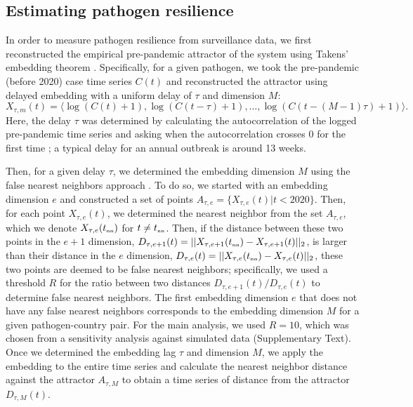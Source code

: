 \documentclass[12pt]{article}
\newcommand{\tsub}[2]{#1_{{\textrm{\tiny #2}}}}
\begin{document}
\subsection*{Estimating pathogen resilience}

In order to measure pathogen resilience from surveillance data, we first reconstructed the empirical pre-pandemic attractor of the system using Takens' embedding theorem \citep{takens2006detecting}.
Specifically, for a given pathogen, we took the pre-pandemic (before 2020) case time series $C(t)$ and reconstructed the attractor using delayed embedding with a uniform delay of $\tau$ and dimension $M$:
\begin{equation}
X_{\tau,m}(t) = \langle\log(C(t)+1), \log(C(t-\tau)+1), \dots, \log(C(t-(M-1)\tau)+1)\rangle.
\end{equation}
Here, the delay $\tau$ was determined by calculating the autocorrelation of the logged pre-pandemic time series and asking when the autocorrelation crosses 0 for the first time \citep{tan2023selecting};
a typical delay for an annual outbreak is around 13 weeks.

Then, for a given delay $\tau$, we determined the embedding dimension $M$ using the false nearest neighbors approach \citep{kennel1992determining,tan2023selecting}.
To do so, we started with an embedding dimension $e$ and constructed a set of points $A_{\tau,e}= \{X_{\tau,e}(t) | t < 2020\}$.
Then, for each point $X_{\tau,e}(t)$, we determined the nearest neighbor from the set $A_{\tau,e}$, which we denote $X_{\tau,e}(\tsub{t}{nn})$ for $t \neq \tsub{t}{nn}$.
Then, if the distance between these two points in the $e+1$ dimension, $D_{\tau,e+1}(t) = ||X_{\tau,e+1}(\tsub{t}{nn})-X_{\tau,e+1}(t)||_2$, is larger than their distance in the $e$ dimension, $D_{\tau,e}(t) = ||X_{\tau,e}(\tsub{t}{nn})-X_{\tau,e}(t)||_2$, these two points are deemed to be false nearest neighbors;
specifically, we used a threshold $R$ for the ratio between two distances $D_{\tau,e+1}(t)/D_{\tau,e}(t)$ to determine false nearest neighbors.
The first embedding dimension $e$ that does not have any false nearest neighbors corresponds to the embedding dimension $M$ for a given pathogen-country pair.
For the main analysis, we used $R=10$, which was chosen from a sensitivity analysis against simulated data (Supplementary Text).
Once we determined the embedding lag $\tau$ and dimension $M$, we apply the embedding to the entire time series and calculate the nearest neighbor distance against the attractor $A_{\tau,M}$ to obtain a time series of distance from the attractor $D_{\tau,M}(t)$.
\end{document}
